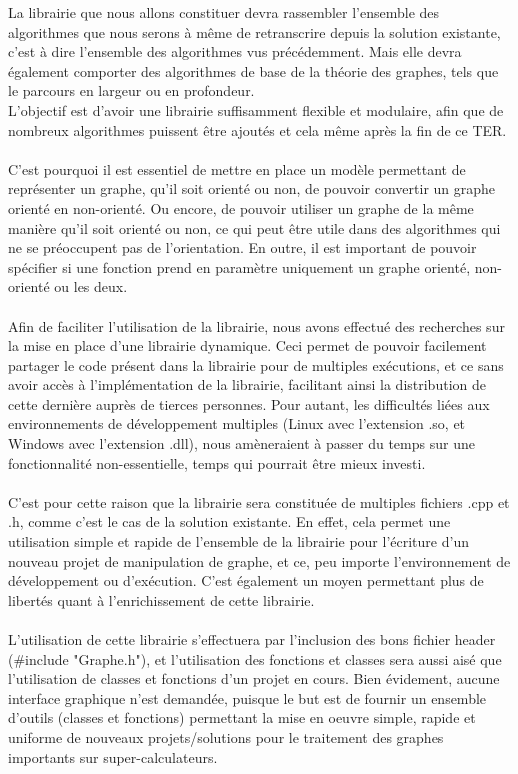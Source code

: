 \begin{titlepage}
{
La librairie que nous allons constituer devra rassembler l'ensemble des algorithmes que nous serons à même de retranscrire depuis la solution existante, c'est à dire l'ensemble des algorithmes vus précédemment. Mais elle devra également comporter des algorithmes de base de la théorie des graphes, tels que le parcours en largeur ou en profondeur. \\ L'objectif est d'avoir une librairie suffisamment flexible et modulaire, afin que de nombreux algorithmes puissent être ajoutés et cela même après la fin de ce TER.
\\ \\ 
C'est pourquoi il est essentiel de mettre en place un modèle permettant de représenter un graphe, qu'il soit orienté ou non, de pouvoir convertir un graphe orienté en non-orienté. Ou encore, de pouvoir utiliser un graphe de la même manière qu'il soit orienté ou non, ce qui peut être utile dans des algorithmes qui ne se préoccupent pas de l'orientation. En outre, il est important de pouvoir spécifier si une fonction prend en paramètre uniquement un graphe orienté, non-orienté ou les deux.
\\ \\ 
Afin de faciliter l'utilisation de la librairie, nous avons effectué des recherches sur la mise en place d'une librairie dynamique. Ceci permet de pouvoir facilement partager le code présent dans la librairie pour de multiples exécutions, et ce sans avoir accès à l'implémentation de la librairie, facilitant ainsi la distribution de cette dernière auprès de tierces personnes. Pour autant, les difficultés liées aux environnements de développement multiples (Linux avec l'extension .so, et Windows avec l'extension .dll), nous amèneraient à passer du temps sur une fonctionnalité non-essentielle, temps qui pourrait être mieux investi.
\\ \\ 
C'est pour cette raison que la librairie sera constituée de multiples fichiers .cpp et .h, comme c'est le cas de la solution existante. En effet, cela permet une utilisation simple et rapide de l'ensemble de la librairie pour l'écriture d'un nouveau projet de manipulation de graphe, et ce, peu importe l'environnement de développement ou d'exécution. C'est également un moyen permettant plus de libertés quant à l'enrichissement de cette librairie.
\\ \\ 
L'utilisation de cette librairie s'effectuera par l'inclusion des bons fichier header (\#include "Graphe.h"), et l'utilisation des fonctions et classes sera aussi aisé que l'utilisation de classes et fonctions d'un projet en cours. Bien évidement, aucune interface graphique n'est demandée, puisque le but est de fournir un ensemble d'outils (classes et fonctions) permettant la mise en oeuvre simple, rapide et uniforme de nouveaux projets/solutions pour le traitement des graphes importants sur super-calculateurs.
}


\end{titlepage}
